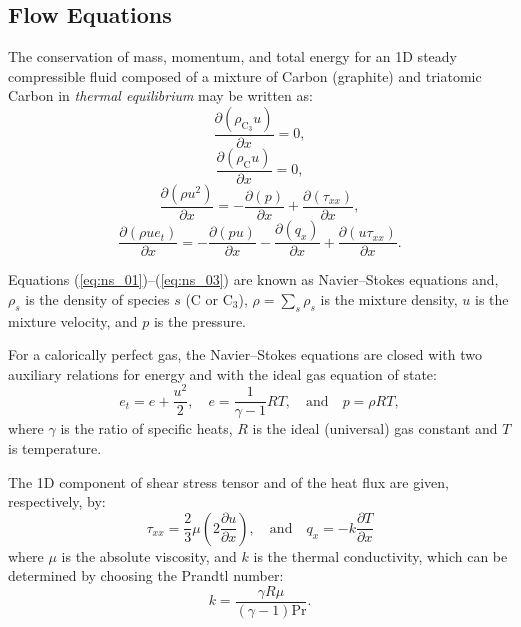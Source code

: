 \documentclass[10pt]{article}
\newcommand{\Diff}[2] {\dfrac{\partial( #1)}{\partial #2}}
\newcommand{\diff}[2] {\dfrac{\partial #1 }{\partial #2}}
\newcommand{\bv}[1]{\ensuremath{\mbox{\boldmath$ #1 $}}}
\newcommand{\C}{\text{C}}
\begin{document}
\subsection{Flow Equations}
The conservation of mass, momentum, and total energy for an 1D steady compressible fluid composed of a mixture of Carbon (graphite) and triatomic Carbon in \textit{thermal equilibrium} may be written as:
\begin{equation}
 \label{eq:ns_01}
\Diff{\rho_{\C_3}  u}{x}=0,
\end{equation}
%
\begin{equation}
 \label{eq:ns_01b}
\Diff{\rho_{\C}  u}{x}=0,
\end{equation}
%
\begin{equation}
 \label{eq:ns_02}
\Diff{\rho u^2 }{x}=- \Diff{p}{x} +\Diff{\tau_{xx}}{x},
\end{equation}
%
\begin{equation}
 \label{eq:ns_03}
\Diff{\rho ue_t}{x}=-\Diff{pu}{x} - \Diff{q_x}{x} + \Diff{u\tau_{xx}}{x} .
\end{equation}
%

Equations (\ref{eq:ns_01})--(\ref{eq:ns_03}) are known as Navier--Stokes equations and, $\rho_s$ is the density of species $s$ (C or C$_3$), $\rho=\sum_s \rho_s$ is the mixture density,  $  u  $ is the mixture velocity, and $p$ is the pressure. 

For a calorically perfect gas, the Navier--Stokes equations are closed with two auxiliary relations for energy and with the ideal gas equation of state:
\begin{equation}
 \label{eq:ns_04}
e_t= e+\dfrac{u^2}{2},\quad e=\dfrac{1}{\gamma -1}RT , \quad\mbox{and}\quad p=\rho RT,
\end{equation}
where $\gamma$ is the ratio of specific heats, $R$ is the ideal (universal) gas constant and $T$ is temperature.

The 1D component of shear stress tensor and of the heat flux are given, respectively, by:
\begin{equation}
   \tau_{xx}= \dfrac{2}{3}  \mu \left( 2 \diff{u}{x} \right),\quad\mbox{and}\quad  q_x = - k \diff{T}{x}
 \end{equation}
where $\mu$ is the absolute viscosity, and $k$ is the thermal conductivity, which can be determined by choosing the Prandtl number:
$$k= \dfrac{\gamma R \mu}{ (\gamma-1) \text{Pr}}.$$
\end{document}
